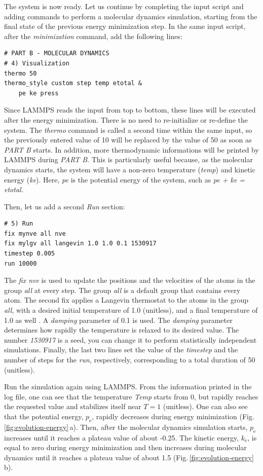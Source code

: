 \documentclass[9pt,tutorial]{livecoms}
\begin{document}
The system is now ready. Let us continue by completing the input script and adding commands to perform a molecular dynamics simulation, starting from the final state of the previous energy minimization step. In the same input script, after the \textit{minimization} command, add the following
lines:
{\normalsize \begin{verbatim}
# PART B - MOLECULAR DYNAMICS
# 4) Visualization
thermo 50
thermo_style custom step temp etotal &
    pe ke press
\end{verbatim}}
Since LAMMPS reads the input from top to bottom, these lines will be executed after the energy minimization. There is no need to re-initialize or re-define the system. The \textit{thermo} command is called a second time within the same input, so the previously entered value of 10 will be replaced by the value of 50 as soon as \textit{PART B} starts. In addition, more thermodynamic informations will be printed by LAMMPS during \textit{PART B}. This is particularly useful because, as the molecular dynamics starts, the system will have a non-zero temperature (\textit{temp}) and kinetic energy (\textit{ke}). Here, \textit{pe} is the potential energy of the system, such as \textit{pe + ke = etotal}.

Then, let us add a second \textit{Run} section:
{\normalsize \begin{verbatim}
# 5) Run
fix mynve all nve
fix mylgv all langevin 1.0 1.0 0.1 1530917
timestep 0.005
run 10000
\end{verbatim}}
The \textit{fix nve} is used to update the positions and the velocities of the atoms in the group \textit{all} at every step. The group \textit{all} is a default group that contains every atom. The second fix applies a Langevin thermostat to the atoms in the group \textit{all}, with a desired initial temperature of 1.0 (unitless), and a final temperature of 1.0 as well \cite{schneider1978molecular}. A \textit{damping} parameter of 0.1 is used. The \textit{damping} parameter determines how rapidly the temperature is relaxed to its desired value. The number \textit{1530917} is a seed, you can change it to perform statistically independent simulations. Finally, the last two lines set the value of the \textit{timestep} and the number of steps for the \textit{run}, respectively, corresponding to a total duration of 50 (unitless).

Run the simulation again using LAMMPS. From the information printed in the log file, one can see that the temperature \textit{Temp} starts from 0, but rapidly reaches the requested value and stabilizes itself near $T=1$ (unitless). One can also see that the potential energy, $p_\text{e}$, rapidly decreases during energy minimization (Fig.\,\ref{fig:evolution-energy}\,a). Then, after the molecular dynamics simulation starts, $p_\text{e}$ increases until it reaches a plateau value of about -0.25. The kinetic energy, $k_\text{e}$, is equal to zero during energy minimization and then increases during molecular dynamics until it reaches a plateau value of about 1.5 (Fig.\,\ref{fig:evolution-energy}\,b).
\end{document}
